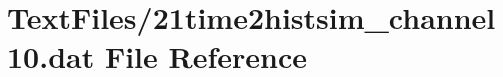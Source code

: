 \hypertarget{21time2histsim__channel10_8dat}{}\section{Text\+Files/21time2histsim\+\_\+channel10.dat File Reference}
\label{21time2histsim__channel10_8dat}
